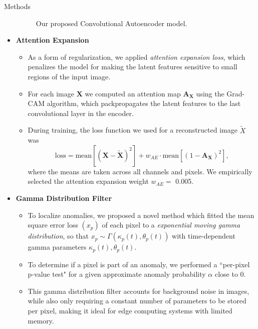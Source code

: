 \documentclass[final,hyperref={pdfpagelabels=false}]{beamer}
\begin{document}
\begin{frame}[t]
\begin{columns}[t]
\begin{column}{.465\textwidth}
\begin{block}{Methods}
\begin{itemize}
\begin{figure}
\caption{Our proposed Convolutional Autoencoder model.}
\end{figure}

\bigskip
\item \textbf{Attention Expansion}

\begin{itemize}
\item As a form of regularization, we applied \textit{attention expansion loss}, which penalizes the model for making the latent features sensitive to small regions of the input image.

\item For each image $\mathbf{X}$ we computed an attention map $\mathbf{A_X}$ using the Grad-CAM algorithm, which packpropagates the latent features to the last convolutional layer in the encoder.

\item During training, the loss function we used for a reconstructed image $\widetilde{X}$ was
$$\text{loss} = \text{mean}[(\mathbf{X} - \widetilde{\mathbf{X}})^2] + w_{AE} \cdot \text{mean}[(1 - \mathbf{A_X})^2],$$
where the means are taken across all channels and pixels. We empirically selected the attention expansion weight $w_{AE} = $ 0.005.\\[6mm]
\end{itemize}

\item\textbf{Gamma Distribution Filter}

\begin{itemize}
\item To localize anomalies, we proposed a novel method which fitted the mean square error loss $(x_p)$ of each pixel to a \textit{exponential moving gamma distribution}, so that $x_p \sim \Gamma(\kappa_p(t), \theta_p(t))$ with time-dependent gamma parameters $\kappa_p(t), \theta_p(t)$.

\item To determine if a pixel is part of an anomaly, we performed a ``per-pixel p-value test" for a given approximate anomaly probability $\alpha$ close to 0.

\item This gamma distribution filter accounts for background noise in images, while also only requiring a constant number of parameters to be stored per pixel, making it ideal for edge computing systems with limited memory.\\[6mm]
\end{itemize}


\end{itemize}
\end{block}
\end{column}
\end{columns}
\end{frame}
\end{document}
